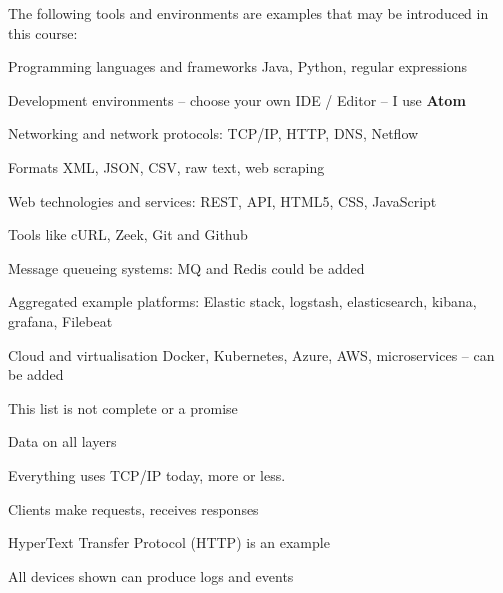 \documentclass[Screen16to9,17pt]{foils}
\begin{document}

The following tools and environments are examples that may be introduced in this course:

\begin{list2}
\item Programming languages and frameworks Java, Python, regular expressions
\item Development environments -- choose your own IDE / Editor -- I use {\bf Atom}
\item Networking and network protocols: TCP/IP, HTTP, DNS, Netflow
\item Formats XML, JSON, CSV, raw text, web scraping
\item Web technologies and services: REST, API, HTML5, CSS, JavaScript
\item Tools like cURL, Zeek, Git and Github
\item Message queueing systems: MQ and Redis could be added
\item Aggregated example platforms: Elastic stack, logstash, elasticsearch, kibana, grafana, Filebeat
\item Cloud and virtualisation Docker, Kubernetes, Azure, AWS, microservices -- can be added
\end{list2}

\centerline{This list is not complete or a promise }




\centerline{Data on all layers}



\begin{list2}
\item Everything uses TCP/IP today, more or less.
\item Clients make requests, receives responses
\item HyperText Transfer Protocol (HTTP) is an example
\item All devices shown can produce logs and events
\end{list2}




\begin{quote}

\end{quote}
\end{document}
